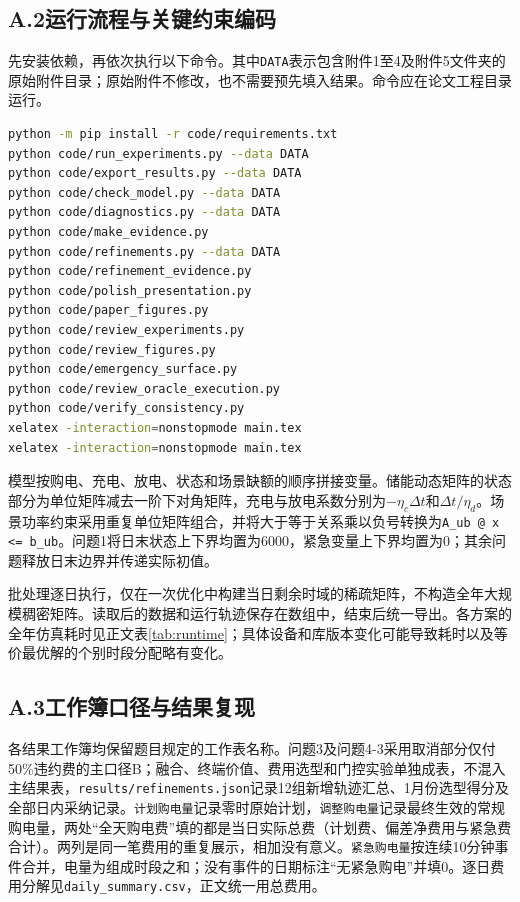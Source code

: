 \documentclass[UTF8,fontset=none,a4paper,zihao=-4]{ctexart}
\newcommand{\dd}{\Delta t}
\begin{document}
\subsection*{A.2\quad 运行流程与关键约束编码}
先安装依赖，再依次执行以下命令。其中\texttt{DATA}表示包含附件1至4及附件5文件夹的原始附件目录；原始附件不修改，也不需要预先填入结果。命令应在论文工程目录运行。
\begin{lstlisting}[language=bash,numbers=none]
python -m pip install -r code/requirements.txt
python code/run_experiments.py --data DATA
python code/export_results.py --data DATA
python code/check_model.py --data DATA
python code/diagnostics.py --data DATA
python code/make_evidence.py
python code/refinements.py --data DATA
python code/refinement_evidence.py
python code/polish_presentation.py
python code/paper_figures.py
python code/review_experiments.py
python code/review_figures.py
python code/emergency_surface.py
python code/review_oracle_execution.py
python code/verify_consistency.py
xelatex -interaction=nonstopmode main.tex
xelatex -interaction=nonstopmode main.tex
\end{lstlisting}
模型按购电、充电、放电、状态和场景缺额的顺序拼接变量。储能动态矩阵的状态部分为单位矩阵减去一阶下对角矩阵，充电与放电系数分别为\(-\eta_c\dd\)和\(\dd/\eta_d\)。场景功率约束采用重复单位矩阵组合，并将大于等于关系乘以负号转换为\texttt{A\_ub @ x <= b\_ub}。问题1将日末状态上下界均置为6000，紧急变量上下界均置为0；其余问题释放日末边界并传递实际初值。

批处理逐日执行，仅在一次优化中构建当日剩余时域的稀疏矩阵，不构造全年大规模稠密矩阵。读取后的数据和运行轨迹保存在数组中，结束后统一导出。各方案的全年仿真耗时见正文表\ref{tab:runtime}；具体设备和库版本变化可能导致耗时以及等价最优解的个别时段分配略有变化。

\subsection*{A.3\quad 工作簿口径与结果复现}
各结果工作簿均保留题目规定的工作表名称。问题3及问题4-3采用取消部分仅付50\%违约费的主口径B；融合、终端价值、费用选型和门控实验单独成表，不混入主结果表，\texttt{results/refinements.json}记录12组新增轨迹汇总、1月份选型得分及全部日内采纳记录。\texttt{计划购电量}记录零时原始计划，\texttt{调整购电量}记录最终生效的常规购电量，两处“全天购电费”填的都是当日实际总费（计划费、偏差净费用与紧急费合计）。两列是同一笔费用的重复展示，相加没有意义。\texttt{紧急购电量}按连续10分钟事件合并，电量为组成时段之和；没有事件的日期标注“无紧急购电”并填0。逐日费用分解见\texttt{daily\_summary.csv}，正文统一用总费用。
\end{document}
